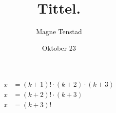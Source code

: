 \title{Tittel.}
\author{Magne Tenstad}
\date{Oktober 23}

	\begin{align*}
		x &= \left(k + 1\right)! \cdot \left(k + 2\right) \cdot \left( k + 3\right)\\
		x &= \left(k + 2\right)! \cdot \left(k + 3\right)\\
		x &= \left(k + 3\right)!\\
	\end{align*}


